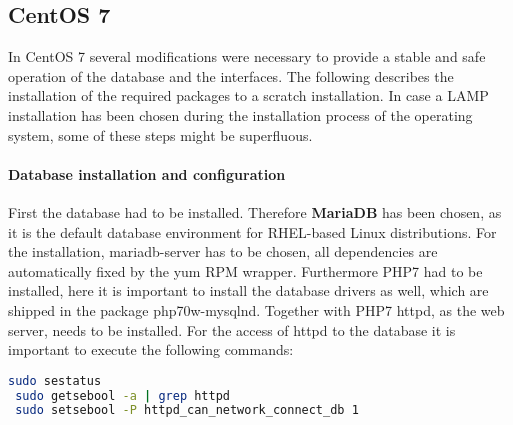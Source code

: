 \subsection{CentOS 7}
In CentOS 7 several modifications were necessary to provide a stable and safe operation of the database and the interfaces. The following describes the installation of the required
packages to a scratch installation. In case a LAMP installation has been chosen during the installation process of the operating system, some of these steps might be superfluous. 
\paragraph{Database installation and configuration}
First the database had to be installed. 
Therefore \textbf{MariaDB} has been chosen, as it is the default database environment for RHEL-based Linux distributions. For the installation, mariadb-server has to be chosen, all
dependencies are automatically fixed by the yum RPM wrapper. Furthermore PHP7 had to be installed, here it is important
to install the database drivers as well, which are shipped in the package php70w-mysqlnd. Together with PHP7 httpd, as the web server, needs to be installed. For the access of httpd
to the database it is important to execute the following commands:\\
\begin{lstlisting}[language=bash]
 sudo sestatus
 sudo getsebool -a | grep httpd
 sudo setsebool -P httpd_can_network_connect_db 1
\end{lstlisting}

